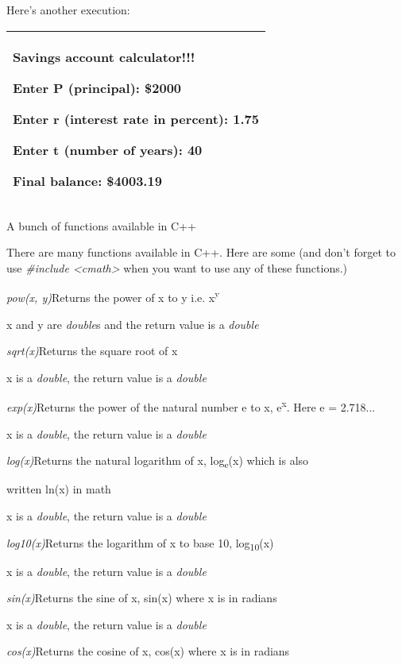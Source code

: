 \documentclass[
]{article}
\begin{document}
Here's another execution:

\begin{longtable}[]{@{}l@{}}
\toprule
\endhead
\begin{minipage}[t]{0.97\columnwidth}\raggedright
Savings account calculator!!!

Enter P (principal): \$\textbf{2000}

Enter r (interest rate in percent): \textbf{1.75}

Enter t (number of years): \textbf{40}

Final balance: \$4003.19\strut
\end{minipage}\tabularnewline
\bottomrule
\end{longtable}

A bunch of functions available in C++

There are many functions available in C++. Here are some (and don't
forget to use \emph{\#include \textless cmath\textgreater{}} when you
want to use any of these functions.)

\emph{pow(x, y)}Returns the power of x to y i.e. x\textsuperscript{y}

\textsuperscript{}x and y are \emph{double}s and the return value is a
\emph{double}

\emph{sqrt(x)}Returns the square root of x

\textsuperscript{}x is a \emph{double}, the return value is a
\emph{double}

\emph{exp(x)}Returns the power of the natural number e to x,
e\textsuperscript{x}. Here e = 2.718...

\textsuperscript{}x is a \emph{double}, the return value is a
\emph{double}

\emph{log(x)}Returns the natural logarithm of x, log\textsubscript{e}(x)
which is also

written ln(x) in math

\textsuperscript{}x is a \emph{double}, the return value is a
\emph{double}

\emph{log10(x)}Returns the logarithm of x to base 10,
log\textsubscript{10}(x)

\textsuperscript{}x is a \emph{double}, the return value is a
\emph{double}

\emph{sin(x)}Returns the sine of x, sin(x) where x is in radians

x is a \emph{double}, the return value is a \emph{double}

\emph{cos(x)}Returns the cosine of x, cos(x) where x is in radians
\end{document}
